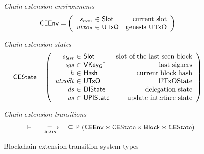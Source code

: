 \documentclass[11pt,a4paper]{article}
\newcommand{\powerset}[1]{\mathbb{P}~#1}
\newcommand{\var}[1]{\mathit{#1}}
\newcommand{\type}[1]{\mathsf{#1}}
\newcommand{\trans}[2]{\xlongrightarrow[\textsc{#1}]{#2}}
\newcommand{\seqof}[1]{#1^{*}}
\newcommand{\Hash}{\type{Hash}}  %
\newcommand{\Slot}{\type{Slot}}
\newcommand{\Block}{\type{Block}}
\newcommand{\VKeyGen}{\type{VKey_G}}
\begin{document}
\begin{figure}[ht]
  \emph{Chain extension environments}
  \begin{equation*}
    \CEEnv
    = \left(
      \begin{array}{r@{~\in~}lr}
        \var{s_{now}} & \Slot & \text{current slot} \\
        \var{utxo_0} & \UTxO & \text{genesis UTxO}
      \end{array}\right)
  \end{equation*}


  \emph{Chain extension states}
  \begin{equation*}
    \CEState =
    \left(
      \begin{array}{r@{~\in~}lr}
        \var{s_{last}} & \Slot & \text{slot of the last seen block} \\
        \var{sgs} & \seqof{\VKeyGen} & \text{last signers}\\
        \var{h} & \Hash & \text{current block hash} \\
        \var{utxoSt} & \UTxO & \text{UTxOState} \\
        \var{ds} & \DIState & \text{delegation state}\\
        \var{us} & \UPIState & \text{update interface state} \\
      \end{array}
    \right)
  \end{equation*}

  \emph{Chain extension transitions}
  \begin{equation*}
    \_ \vdash \var{\_} \trans{chain}{\_} \var{\_} \subseteq
    \powerset (\CEEnv \times \CEState \times \Block \times \CEState)
  \end{equation*}

  \caption{Blockchain extension transition-system types}
  \label{fig:ts-types:chain-extension}
\end{figure}
\end{document}
